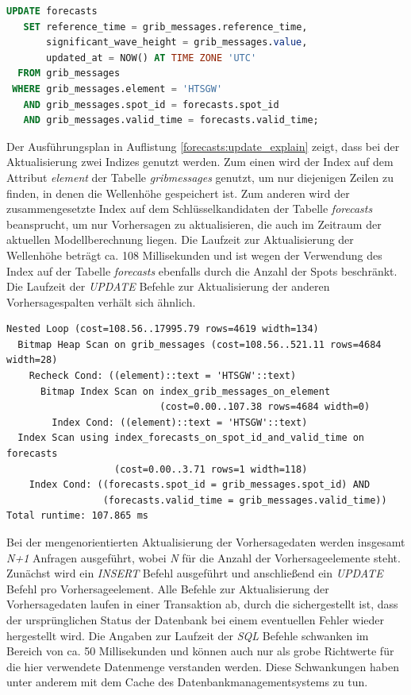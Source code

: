 \begin{lstlisting}[captionpos=b, caption=Aktualisierung der Wellenhöhe, label=forecasts:update, language=SQL]
UPDATE forecasts
   SET reference_time = grib_messages.reference_time,
       significant_wave_height = grib_messages.value,
       updated_at = NOW() AT TIME ZONE 'UTC'
  FROM grib_messages
 WHERE grib_messages.element = 'HTSGW'
   AND grib_messages.spot_id = forecasts.spot_id
   AND grib_messages.valid_time = forecasts.valid_time;
\end{lstlisting}

Der Ausführungsplan in Auflistung \ref{forecasts:update_explain}
zeigt, dass bei der Aktualisierung zwei Indizes genutzt werden. Zum
einen wird der Index auf dem Attribut \textit{element} der Tabelle
\textit{grib\textunderscore messages} genutzt, um nur diejenigen
Zeilen zu finden, in denen die Wellenhöhe gespeichert ist. Zum anderen
wird der zusammengesetzte Index auf dem Schlüsselkandidaten der
Tabelle \textit{forecasts} beansprucht, um nur Vorhersagen zu
aktualisieren, die auch im Zeitraum der aktuellen Modellberechnung
liegen. Die Laufzeit zur Aktualisierung der Wellenhöhe beträgt ca. 108
Millisekunden und ist wegen der Verwendung des Index auf der Tabelle
\textit{forecasts} ebenfalls durch die Anzahl der Spots
beschränkt. Die Laufzeit der \textit{UPDATE} Befehle zur
Aktualisierung der anderen Vorhersagespalten verhält sich ähnlich.

\begin{lstlisting}[captionpos=b, caption=Ausführungsplan der Aktualisierung, label=forecasts:update_explain]
Nested Loop (cost=108.56..17995.79 rows=4619 width=134)
  Bitmap Heap Scan on grib_messages (cost=108.56..521.11 rows=4684 width=28)
    Recheck Cond: ((element)::text = 'HTSGW'::text)
      Bitmap Index Scan on index_grib_messages_on_element  
                           (cost=0.00..107.38 rows=4684 width=0)
        Index Cond: ((element)::text = 'HTSGW'::text)
  Index Scan using index_forecasts_on_spot_id_and_valid_time on forecasts 
                   (cost=0.00..3.71 rows=1 width=118)
    Index Cond: ((forecasts.spot_id = grib_messages.spot_id) AND 
                 (forecasts.valid_time = grib_messages.valid_time))
Total runtime: 107.865 ms
\end{lstlisting}

Bei der mengenorientierten Aktualisierung der Vorhersagedaten werden
insgesamt \textit{N+1} Anfragen ausgeführt, wobei \textit{N} für die
Anzahl der Vorhersageelemente steht. Zunächst wird ein \textit{INSERT}
Befehl ausgeführt und anschließend ein \textit{UPDATE} Befehl pro
Vorhersageelement. Alle Befehle zur Aktualisierung der Vorhersagedaten
laufen in einer Transaktion ab, durch die sichergestellt ist, dass der
ursprünglichen Status der Datenbank bei einem eventuellen Fehler
wieder hergestellt wird. Die Angaben zur Laufzeit der \textit{SQL}
Befehle schwanken im Bereich von ca. 50 Millisekunden und können auch
nur als grobe Richtwerte für die hier verwendete Datenmenge verstanden
werden. Diese Schwankungen haben unter anderem mit dem Cache des
Datenbankmanagementsystems zu tun.

